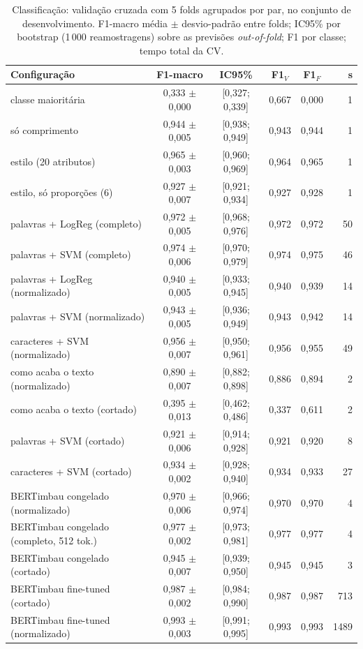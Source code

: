 \begin{table}[t]\centering\scriptsize
\caption{Classificação: validação cruzada com 5 folds agrupados por par, no conjunto de desenvolvimento. F1-macro média $\pm$ desvio-padrão entre folds; IC95\% por bootstrap (1\,000 reamostragens) sobre as previsões \emph{out-of-fold}; F1 por classe; tempo total da CV.}\label{tab:cv}
\begin{tabular}{lccccr}
\toprule
Configuração & F1-macro & IC95\% & F1$_V$ & F1$_F$ & s \\
\midrule
classe maioritária & 0,333 $\pm$ 0,000 & [0,327; 0,339] & 0,667 & 0,000 & 1 \\
só comprimento & 0,944 $\pm$ 0,005 & [0,938; 0,949] & 0,943 & 0,944 & 1 \\
estilo (20 atributos) & 0,965 $\pm$ 0,003 & [0,960; 0,969] & 0,964 & 0,965 & 1 \\
estilo, só proporções (6) & 0,927 $\pm$ 0,007 & [0,921; 0,934] & 0,927 & 0,928 & 1 \\
palavras + LogReg (completo) & 0,972 $\pm$ 0,005 & [0,968; 0,976] & 0,972 & 0,972 & 50 \\
palavras + SVM (completo) & 0,974 $\pm$ 0,006 & [0,970; 0,979] & 0,974 & 0,975 & 46 \\
palavras + LogReg (normalizado) & 0,940 $\pm$ 0,005 & [0,933; 0,945] & 0,940 & 0,939 & 14 \\
palavras + SVM (normalizado) & 0,943 $\pm$ 0,005 & [0,936; 0,949] & 0,943 & 0,942 & 14 \\
caracteres + SVM (normalizado) & 0,956 $\pm$ 0,007 & [0,950; 0,961] & 0,956 & 0,955 & 49 \\
como acaba o texto (normalizado) & 0,890 $\pm$ 0,007 & [0,882; 0,898] & 0,886 & 0,894 & 2 \\
como acaba o texto (cortado) & 0,395 $\pm$ 0,013 & [0,462; 0,486] & 0,337 & 0,611 & 2 \\
palavras + SVM (cortado) & 0,921 $\pm$ 0,006 & [0,914; 0,928] & 0,921 & 0,920 & 8 \\
caracteres + SVM (cortado) & 0,934 $\pm$ 0,002 & [0,928; 0,940] & 0,934 & 0,933 & 27 \\
BERTimbau congelado (normalizado) & 0,970 $\pm$ 0,006 & [0,966; 0,974] & 0,970 & 0,970 & 4 \\
BERTimbau congelado (completo, 512 tok.) & 0,977 $\pm$ 0,002 & [0,973; 0,981] & 0,977 & 0,977 & 4 \\
BERTimbau congelado (cortado) & 0,945 $\pm$ 0,007 & [0,939; 0,950] & 0,945 & 0,945 & 3 \\
BERTimbau fine-tuned (cortado) & 0,987 $\pm$ 0,002 & [0,984; 0,990] & 0,987 & 0,987 & 713 \\
BERTimbau fine-tuned (normalizado) & 0,993 $\pm$ 0,003 & [0,991; 0,995] & 0,993 & 0,993 & 1489 \\
\bottomrule
\end{tabular}\par{}
\end{table}
